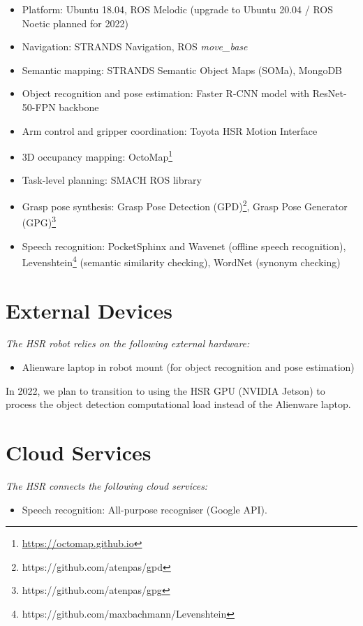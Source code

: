 \begin{itemize}
	\item Platform: Ubuntu 18.04, ROS Melodic (upgrade to Ubuntu 20.04 / ROS Noetic planned for 2022) 
	\item Navigation: STRANDS Navigation, ROS  \textit{move\_base}
	\item Semantic mapping: STRANDS Semantic Object Maps (SOMa), MongoDB
	\item Object recognition and pose estimation: Faster R-CNN model with ResNet-50-FPN backbone
	\item Arm control and gripper coordination: Toyota HSR Motion Interface
	\item 3D occupancy mapping: OctoMap\footnote{\url{https://octomap.github.io}}
	\item Task-level planning: SMACH ROS library
	\item Grasp pose synthesis: Grasp Pose Detection  (GPD)\footnote{https://github.com/atenpas/gpd}, Grasp Pose Generator (GPG)\footnote{https://github.com/atenpas/gpg}
	\item Speech recognition: PocketSphinx and Wavenet (offline speech recognition), Levenshtein\footnote{https://github.com/maxbachmann/Levenshtein} (semantic similarity checking), WordNet (synonym checking) 
\end{itemize}

\section*{External Devices}

\textit{The HSR robot relies on the following external hardware:}

\begin{itemize}
	\item Alienware laptop in robot mount (for object recognition and pose estimation)
\end{itemize}

In 2022, we plan to transition to using the HSR GPU (NVIDIA Jetson) to process the object detection computational load instead of the Alienware laptop.

\section*{Cloud Services}

\textit{The HSR connects the following cloud services:}
\begin{itemize}
	\item Speech recognition: All-purpose recogniser (Google API).
\end{itemize}